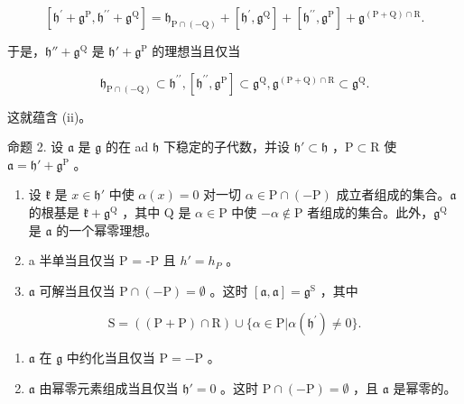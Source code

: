 \[
[ \mathfrak {h} ^ {\prime} + \mathfrak {g} ^ {\mathrm{P}}, \mathfrak {h} ^ {\prime \prime} + \mathfrak {g} ^ {\mathrm{Q}} ] = \mathfrak {h} _ {\mathrm{P} \cap (- \mathrm{Q})} + [ \mathfrak {h} ^ {\prime}, \mathfrak {g} ^ {\mathrm{Q}} ] + [ \mathfrak {h} ^ {\prime \prime}, \mathfrak {g} ^ {\mathrm{P}} ] + \mathfrak {g} ^ {(\mathrm{P} + \mathrm{Q}) \cap \mathrm{R}}.
\]

于是，\(\mathfrak{h}'' + \mathfrak{g}^{\mathrm{Q}}\) 是 \(\mathfrak{h}' + \mathfrak{g}^{\mathrm{P}}\) 的理想当且仅当

\[
\mathfrak {h} _ {\mathrm{P} \cap (- \mathrm{Q})} \subset \mathfrak {h} ^ {\prime \prime}, [ \mathfrak {h} ^ {\prime \prime}, \mathfrak {g} ^ {\mathrm{P}} ] \subset \mathfrak {g} ^ {\mathrm{Q}}, \mathfrak {g} ^ {(\mathrm{P} + \mathrm{Q}) \cap \mathrm{R}} \subset \mathfrak {g} ^ {\mathrm{Q}}.
\]

这就蕴含 (ii)。

命题 2. 设 \(\mathfrak{a}\) 是 \(\mathfrak{g}\) 的在 ad \(\mathfrak{h}\) 下稳定的子代数，并设 \(\mathfrak{h}' \subset \mathfrak{h}\) ，\(\mathrm{P} \subset \mathrm{R}\) 使 \(\mathfrak{a} = \mathfrak{h}' + \mathfrak{g}^{\mathrm{P}}\) 。

\begin{enumerate}
\def\labelenumi{(\roman{enumi})}
\item
  设 \(\mathfrak{k}\) 是 \(x\in \mathfrak{h}'\) 中使 \(\alpha (x) = 0\) 对一切 \(\alpha \in \mathrm{P}\cap (-\mathrm{P})\) 成立者组成的集合。\(\mathfrak{a}\) 的根基是 \(\mathfrak{k} + \mathfrak{g}^{\mathrm{Q}}\) ，其中 \(\mathrm{Q}\) 是 \(\alpha \in \mathrm{P}\) 中使 \(-\alpha \notin \mathrm{P}\) 者组成的集合。此外，\(\mathfrak{g}^{\mathrm{Q}}\) 是 \(\mathfrak{a}\) 的一个幂零理想。
\item
  a 半单当且仅当 P = -P 且 \(h' = h_{P}\) 。
\item
  \(\mathfrak{a}\) 可解当且仅当 \(\mathrm{P} \cap (-\mathrm{P}) = \emptyset\) 。这时 \([\mathfrak{a}, \mathfrak{a}] = \mathfrak{g}^{\mathrm{S}}\) ，其中
\end{enumerate}

\[
\mathrm{S} = ((\mathrm{P} + \mathrm{P}) \cap \mathrm{R}) \cup \{\alpha \in \mathrm{P} | \alpha (\mathfrak {h} ^ {\prime}) \neq 0 \}.
\]

\begin{enumerate}
\def\labelenumi{(\roman{enumi})}
\setcounter{enumi}{3}
\item
  \(\mathfrak{a}\) 在 \(\mathfrak{g}\) 中约化当且仅当 \(\mathrm{P} = -\mathrm{P}\) 。
\item
  \(\mathfrak{a}\) 由幂零元素组成当且仅当 \(\mathfrak{h}' = 0\) 。这时 \(\mathrm{P} \cap (-\mathrm{P}) = \emptyset\) ，且 \(\mathfrak{a}\) 是幂零的。
\end{enumerate}

